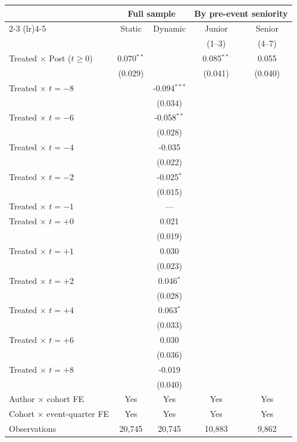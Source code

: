 \begin{center}
\begin{table}[t]
\begin{tabular}{lcccc}
 & \multicolumn{2}{c}{Full sample} & \multicolumn{2}{c}{By pre-event seniority} \\
\cmidrule(lr){2-3} \cmidrule(lr){4-5}
 & Static & Dynamic & Junior & Senior \\
 & & & \small(1--3) & \small(4--7) \\
\midrule
\quad Treated $\times$ Post ($t\geq 0$) & 0.070$^{**}$ &  & 0.085$^{**}$ & 0.055 \\
 & (0.029) &  & (0.041) & (0.040) \\
\addlinespace
\quad Treated $\times$ $t=-8$ &  & -0.094$^{***}$ &  &  \\
 &  & (0.034) &  &  \\
\quad Treated $\times$ $t=-6$ &  & -0.058$^{**}$ &  &  \\
 &  & (0.028) &  &  \\
\quad Treated $\times$ $t=-4$ &  & -0.035 &  &  \\
 &  & (0.022) &  &  \\
\quad Treated $\times$ $t=-2$ &  & -0.025$^{*}$ &  &  \\
 &  & (0.015) &  &  \\
\quad Treated $\times$ $t=-1$ & & --- & & \\
\quad Treated $\times$ $t=+0$ &  & 0.021 &  &  \\
 &  & (0.019) &  &  \\
\quad Treated $\times$ $t=+1$ &  & 0.030 &  &  \\
 &  & (0.023) &  &  \\
\quad Treated $\times$ $t=+2$ &  & 0.046$^{*}$ &  &  \\
 &  & (0.028) &  &  \\
\quad Treated $\times$ $t=+4$ &  & 0.063$^{*}$ &  &  \\
 &  & (0.033) &  &  \\
\quad Treated $\times$ $t=+6$ &  & 0.030 &  &  \\
 &  & (0.036) &  &  \\
\quad Treated $\times$ $t=+8$ &  & -0.019 &  &  \\
 &  & (0.040) &  &  \\
\midrule
Author $\times$ cohort FE & Yes & Yes & Yes & Yes \\
Cohort $\times$ event-quarter FE & Yes & Yes & Yes & Yes \\
Observations & 20,745 & 20,745 & 10,883 & 9,862 \\
\bottomrule
\end{tabular}
\end{table}
\end{center}
